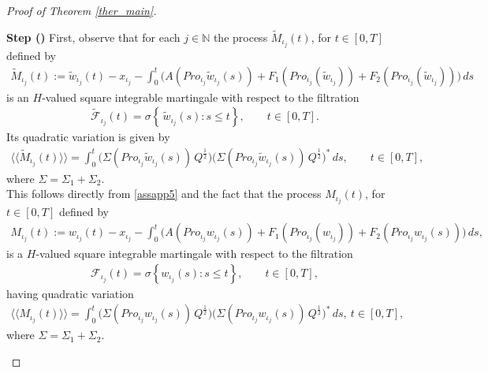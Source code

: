 \documentclass[english,a4paper,11pt]{amsart}
\theoremstyle{plain}
\theoremstyle{definition}
\theoremstyle{remark}
\numberwithin{equation}{section}
\newcounter{lil1}
\newenvironment{step}
{\begin{list} { \bf Step (\Roman{lil1})}
		{ \usecounter{lil1}
			\setlength{\leftmargin}{0.0cm}
			\setlength{\topsep}{0.2cm}
			\setlength{\itemsep}{0.0cm}
			\setlength{\parsep}{0.1cm}
			\setlength{\itemindent}{0.8cm}
			\setlength{\parskip}{0.0cm}}}
	{\end{list}}
\newcounter{lil33}
\newcounter{lil1q}
\newcommand{\wi}[1]{{\widetilde{#1}}}
\def\wi{\widetilde}
\newcommand{\Pro}{Pro}
\begin{document}
\begin{proof}[Proof of Theorem \ref{ther_main}]
\begin{step}
	First, observe that for each $j\in\mathbb{N}$ the process $\widetilde{M}_{\iota_j}(t)$, for $t\in[0,T]$ defined by 
	\begin{align*}
		\widetilde{M}_{\iota_j}(t)
		:=\widetilde{w}_{\iota_j}(t)-x_{\iota_j}
		-\int_0^t \Big(A (\Pro_{\iota_j}\widetilde{w}_{\iota_j}(s))+F_1 (\Pro_{\iota_j}(\wi{w}_{\iota_j}))+F_2 (\Pro_{\iota_j}(\wi{w}_{\iota_j}))\Big)\,ds
	\end{align*}
	is an $H$-valued square integrable martingale with respect to the filtration
	\begin{align*}
		\widetilde{\mathcal{F}}_{\iota_j}(t)
		=\sigma\!\left\{\,\widetilde{w}_{\iota_j}(s): s\le t \right\},
		\qquad t\in[0,T].
	\end{align*}
	Its quadratic variation is given by
	\begin{align*}
		\big\langle\!\big\langle \widetilde{M}_{\iota_j}(t) \big\rangle\!\big\rangle
		=\int_0^t 
		\bigl(\Sigma(\Pro_{\iota_j}\widetilde{w}_{\iota_j}(s))\,Q^{\frac{1}{2}}\bigr)
		\bigl(\Sigma(\Pro_{\iota_j}\widetilde{w}_{\iota_j}(s))\,Q^{\frac{1}{2}}\bigr)^{*}
		\,ds,
		\qquad t\in[0,T],
	\end{align*}where $\Sigma=\Sigma_1+\Sigma_2$.
\\	This follows directly from \eqref{assapp5} and the fact that the process $M_{\iota_j}(t)$, for $t\in[0,T]$ defined by
	\begin{align*}
		M_{\iota_j}(t)
		:=w_{\iota_j}(t)-x_{\iota_j}
		-\int_0^t\Big( A(\Pro_{\iota_j}w_{\iota_j}(s))+F_1 (\Pro_{\iota_j}({w}_{\iota_j}))+F_2(\Pro_{\iota_j}w_{\iota_j}(s))\Big)\,ds,
	\end{align*}
	is a $H$-valued square integrable martingale with respect to the filtration
	\begin{align*}
		\mathcal{F}_{\iota_j}(t)
		=\sigma\!\left\{ w_{\iota_j}(s): s\le t \right\},
		\qquad t\in[0,T],
	\end{align*}
	having quadratic variation
	\begin{align*}
		\big\langle\!\big\langle M_{\iota_j}(t)\big\rangle\!\big\rangle
		=\int_0^t 
		\bigl(\Sigma(\Pro_{\iota_j}w_{\iota_j}(s))\,Q^{\frac{1}{2}}\bigr)
		\bigl(\Sigma(\Pro_{\iota_j}w_{\iota_j}(s))\,Q^{\frac{1}{2}}\bigr)^{*}
		\,ds,
		\ t\in[0,T],
	\end{align*}where $\Sigma=\Sigma_1+\Sigma_2$.


\end{step}
\end{proof}
\end{document}
